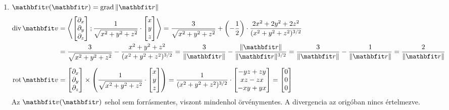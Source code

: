 \documentclass{szb-solution}
\begin{document}
\begin{enumerate}
  \item $\rvec v(\coordvec) = \grad \|\coordvec\|$
        \begin{align*}
          \Div \rvec v
           & = \scalar{
            \begin{bmatrix}
              \partial_x \\ \partial_y \\ \partial_z
            \end{bmatrix}
          }{
            \frac{1}{\sqrt{x^2 + y^2 + z^2}}
            \cdot
            \begin{bmatrix}
              x \\ y \\ z
            \end{bmatrix}
          }
          = \frac{3}{\sqrt{x^2 + y^2 + z^2}}
          + \left( -\frac{1}{2} \right) \cdot \frac{
            2x^2 + 2y^2 + 2z^2
          }{
            (x^2 + y^2 + z^2)^{3/2}
          }
          \\
           & = \frac{3}{\sqrt{x^2 + y^2 + z^2}}
          - \frac{x^2 + y^2 + z^2}{(x^2 + y^2 + z^2)^{3/2}}
          = \frac{3}{\|\coordvec\|} - \frac{\|\coordvec\|}{\|\coordvec\|^{3/2}}
          = \frac{3}{\|\coordvec\|} - \frac{1}{\|\coordvec\|}
          = \frac{2}{\|\coordvec\|}
          \\[2mm]
          \rot \rvec v
           & =
          \begin{bmatrix}
            \partial_x \\ \partial_y \\ \partial_z
          \end{bmatrix}
          \times \left(
          \frac{1}{\sqrt{x^2 + y^2 + z^2}} \cdot
          \begin{bmatrix}
            x \\ y \\ z
          \end{bmatrix}
          \right)
          = \frac{1}{(x^2 + y^2 + z^2)^{3/2}} \cdot
          \begin{bmatrix}
            -yz + zy \\
            xz - zx  \\
            -xy + yx
          \end{bmatrix} = \begin{bmatrix}
                            0 \\ 0 \\ 0
                          \end{bmatrix}
        \end{align*}
        Az $\rvec v(\coordvec)$ sehol sem forrásmentes, viszont mindenhol
        örvénymentes. A divergencia az origóban nincs értelmezve.


\end{enumerate}
\end{document}
